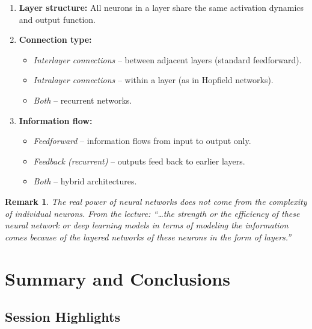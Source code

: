 \documentclass[12pt,a4paper]{article}
\newtheorem{remark}{Remark}[section]
\begin{document}
\begin{enumerate}[label=(\alph*)]
  \item \textbf{Layer structure:} All neurons in a layer share the same
        activation dynamics and output function.
  \item \textbf{Connection type:}
        \begin{itemize}
          \item \emph{Interlayer connections} -- between adjacent layers
                (standard feedforward).
          \item \emph{Intralayer connections} -- within a layer
                (as in Hopfield networks).
          \item \emph{Both} -- recurrent networks.
        \end{itemize}
  \item \textbf{Information flow:}
        \begin{itemize}
          \item \emph{Feedforward} -- information flows from input to
                output only.
          \item \emph{Feedback (recurrent)} -- outputs feed back to
                earlier layers.
          \item \emph{Both} -- hybrid architectures.
        \end{itemize}
\end{enumerate}

\begin{remark}
\label{rem:power-of-layers}
The real power of neural networks does not come from the complexity
of individual neurons.
From the lecture: ``\ldots the strength or the efficiency of these neural
network or deep learning models in terms of modeling the information
comes because of the layered networks of these neurons in the form of
layers.''
\end{remark}

\section{Summary and Conclusions}
\label{sec:summary}

\subsection{Session Highlights}
\label{subsec:highlights}
\end{document}
